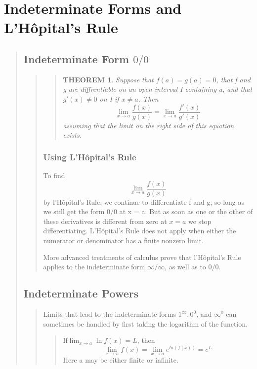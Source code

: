 \documentclass{report}
\newtheorem{theorem}{THEOREM}
\begin{document}
\section{Indeterminate Forms and L’Hôpital’s Rule}
\begin{quote}

	\subsection{Indeterminate Form $0/0$}
	\begin{quote}

		\begin{quote}
		\begin{theorem}
			Suppose that $f(a) = g(a) = 0$, that f and g are diffrentiable on an open interval I containing a, and that $g'(x) \neq 0$ on I if $x \neq a$. Then
			$$\lim_{x \to a} \frac{f(x)}{g(x)} = \lim_{x \to a} \frac{f'(x)}{g'(x)}$$
			assuming that the limit on the right side of this equation exists.
		\end{theorem}
		\end{quote}

		
		\subsubsection{Using L’Hôpital’s Rule }
		To find
		$$\lim_{x \to a} \frac{f(x)}{g(x)}$$
		by l’Hôpital’s Rule, we continue to differentiate ƒ and g, so long as we still get the form $0/0$ at x = a. But as soon as one or the other of these derivatives is different from zero at $x = a$ we stop differentiating. L’Hôpital’s Rule does not apply when either the numerator or denominator has a finite nonzero limit.
		
		\begin{info}
			More advanced treatments of calculus prove that l’Hôpital’s Rule applies to the indeterminate form $\infty / \infty$, as well as to $0/0$.
		\end{info}
		
	\end{quote}

	\subsection{Indeterminate Powers}
	\begin{quote}
		Limits that lead to the indeterminate forms $1^\infty, 0^0$, and $\infty^0$ can sometimes be handled by first taking the logarithm of the function.

		\begin{quote}
			If$\lim_{{x \to a }} \ln f(x) = L$, then
			$$\lim_{x \to a}f(x)= \lim_{x \to a} e ^{ln(f(x))} = e^L$$
			Here a may be either finite or infinite.
		\end{quote}

	\end{quote}

\end{quote}
\end{document}
